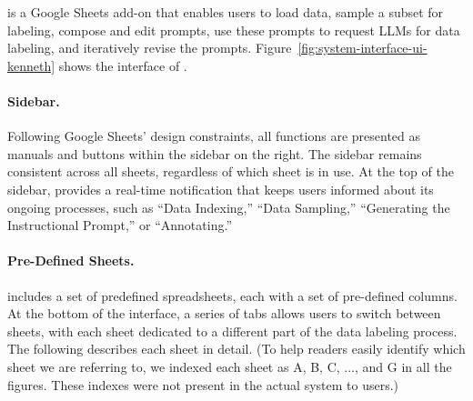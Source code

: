 
\system is a Google Sheets add-on that enables users to load data, sample a subset for labeling, compose and edit prompts, use these prompts to request LLMs for data labeling, and iteratively revise the prompts. 
Figure~\ref{fig:system-interface-ui-kenneth} shows the interface of \system.

\paragraph{Sidebar.}
Following Google Sheets' design constraints, all functions are presented as manuals and buttons within the sidebar on the right. 
The sidebar remains consistent across all sheets, regardless of which sheet is in use. 
At the top of the sidebar, \system provides a real-time notification that keeps users informed about its ongoing processes, such as ``Data Indexing,'' ``Data Sampling,'' ``Generating the Instructional Prompt,'' or ``Annotating.''


\paragraph{Pre-Defined Sheets.}
\system includes a set of predefined spreadsheets, each with a set of pre-defined columns. 
At the bottom of the interface, a series of tabs allows users to switch between sheets, with each sheet dedicated to a different part of the data labeling process. 
The following describes each sheet in detail. 
(To help readers easily identify which sheet we are referring to, we indexed each sheet as A, B, C, ..., and G in all the figures. 
These indexes were not present in the actual system to users.)



